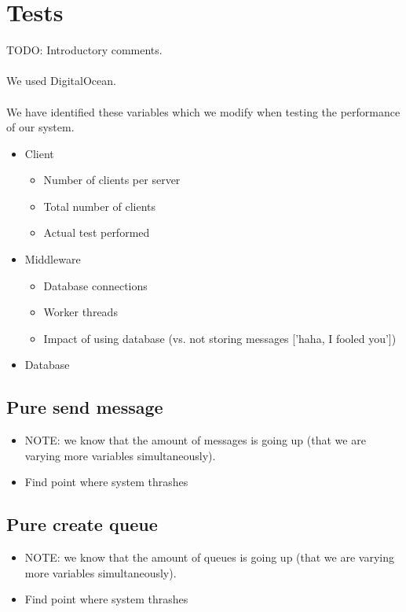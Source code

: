 \documentclass{article}
\begin{document}
    \section{Tests}
        TODO: Introductory comments.\\
        \\
        We used DigitalOcean.\\
        \\
        We have identified these variables which we modify when testing the performance of our system.

        \begin{itemize}
            \item Client
            \begin{itemize}
                \item Number of clients per server
                \item Total number of clients
                \item Actual test performed
            \end{itemize}
            \item Middleware
            \begin{itemize}
                \item Database connections
                \item Worker threads
                \item Impact of using database (vs. not storing messages ['haha, I fooled you'])
            \end{itemize}
            \item Database
        \end{itemize}

        \subsection{Pure send message}
            \begin{itemize}
                \item NOTE: we know that the amount of messages is going up (that we are varying more variables simultaneously).
                \item Find point where system thrashes
            \end{itemize}

        \subsection{Pure create queue}
            \begin{itemize}
                \item NOTE: we know that the amount of queues is going up (that we are varying more variables simultaneously).
                \item Find point where system thrashes
            \end{itemize}
\end{document}
